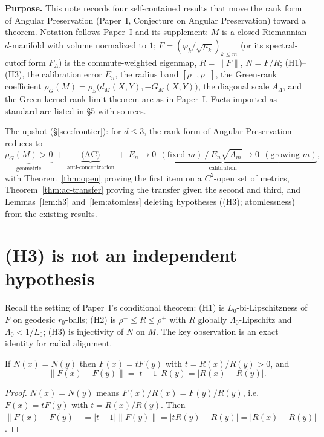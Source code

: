 
\noindent\textbf{Purpose.} This note records four self-contained results that move the
rank form of Angular Preservation (Paper~I, Conjecture on Angular Preservation) toward a
theorem. Notation follows Paper~I and its supplement: $M$ is a closed Riemannian
$d$-manifold with volume normalized to $1$; $F=(\varphi_k/\sqrt{\mu_k})_{k\le m}$ (or its
spectral-cutoff form $F_\Lambda$) is the commute-weighted eigenmap, $R=\lVert F\rVert$,
$N=F/R$; (H1)--(H3), the calibration error $E_n$, the radius band $[\rho^-,\rho^+]$, the
Green-rank coefficient $\rho_G(M)=\rho_S\bigl(d_M(X,Y),-G_M(X,Y)\bigr)$, the diagonal
scale $A_\Lambda$, and the Green-kernel rank-limit theorem are as in Paper~I.
Facts imported as standard are listed in \S5 with sources.

The upshot (\S\ref{sec:frontier}): for $d\le3$, the rank form of Angular Preservation
reduces to
\[
\underbrace{\rho_G(M)>0}_{\text{geometric}}\ +\
\underbrace{\text{(AC)}}_{\text{anti-concentration}}\ +\
\underbrace{E_n\to0\ \ (\text{fixed }m)\ \big/\ E_n\sqrt{A_m}\to0\ \ (\text{growing }m)}_{\text{calibration}},
\]
with Theorem~\ref{thm:open} proving the first item on a $C^2$-open set of metrics,
Theorem~\ref{thm:ac-transfer} proving the transfer given the second and third, and
Lemmas~\ref{lem:h3} and~\ref{lem:atomless} deleting hypotheses ((H3); atomlessness) from
the existing results.

\section{(H3) is not an independent hypothesis}

Recall the setting of Paper~I's conditional theorem: (H1) is $L_0$-bi-Lipschitzness of
$F$ on geodesic $r_0$-balls; (H2) is $\rho^-\le R\le\rho^+$ with $R$ globally
$\Lambda_0$-Lipschitz and $\Lambda_0<1/L_0$; (H3) is injectivity of $N$ on $M$. The key
observation is an exact identity for radial alignment.

\begin{lemma}\label{lem:align}
If $N(x)=N(y)$ then $F(x)=tF(y)$ with $t=R(x)/R(y)>0$, and
\[
\lVert F(x)-F(y)\rVert=\lvert t-1\rvert\,R(y)=\lvert R(x)-R(y)\rvert .
\]
\end{lemma}

\begin{proof}
$N(x)=N(y)$ means $F(x)/R(x)=F(y)/R(y)$, i.e.\ $F(x)=tF(y)$ with $t=R(x)/R(y)$. Then
$\lVert F(x)-F(y)\rVert=\lvert t-1\rvert\lVert F(y)\rVert=\lvert tR(y)-R(y)\rvert
=\lvert R(x)-R(y)\rvert$.
\end{proof}


